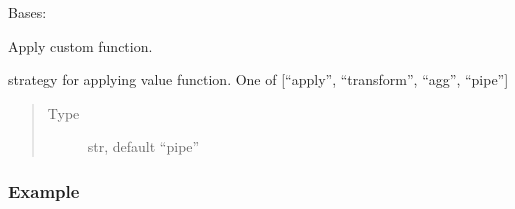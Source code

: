 \documentclass[letterpaper,10pt,english]{sphinxmanual}
\begin{document}
\begin{fulllineitems}
\label{\detokenize{dalio.pipe:dalio.pipe.col_generation.Custom}}
Bases: {\hyperref[\detokenize{beginners-guide:dalio.pipe.col_generation._ColGeneration}]{}}

Apply custom function.

\begin{fulllineitems}
\label{\detokenize{dalio.pipe:dalio.pipe.col_generation.Custom.strategy}}
strategy for applying value function.
One of {[}“apply”, “transform”, “agg”, “pipe”{]}
\begin{quote}\begin{description}
\item[{Type}] \leavevmode
str, default “pipe”

\end{description}\end{quote}

\end{fulllineitems}

\subsubsection*{Example}


\end{fulllineitems}
\end{document}
